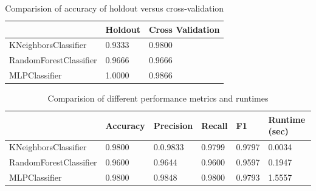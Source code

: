 \documentclass{article}
\begin{document}
\begin{table}[]
\begin{center}
\begin{tabular}{|l|l|l|}
\hline
                       & Holdout & Cross Validation \\ \hline
KNeighborsClassifier   & 0.9333  & 0.9800           \\ \hline
RandomForestClassifier & 0.9666  & 0.9666           \\ \hline
MLPClassifier          & 1.0000  & 0.9866           \\ \hline
\end{tabular}
\caption{Comparision of accuracy of holdout versus cross-validation}
\end{center}
\end{table}
\begin{table}[]
\begin{center}
\begin{tabular}{|l|l|l|l|l|l|}
\hline
                       & Accuracy & Precision & Recall & F1     & Runtime (sec) \\ \hline
KNeighborsClassifier   & 0.9800   & 0.0.9833  & 0.9799 & 0.9797 & 0.0034        \\ \hline
RandomForestClassifier & 0.9600   & 0.9644    & 0.9600 & 0.9597 & 0.1947        \\ \hline
MLPClassifier          & 0.9800   & 0.9848    & 0.9800 & 0.9793 & 1.5557        \\ \hline
\end{tabular}
\caption{Comparision of different performance metrics and runtimes}
\end{center}
\end{table}
\end{document}
